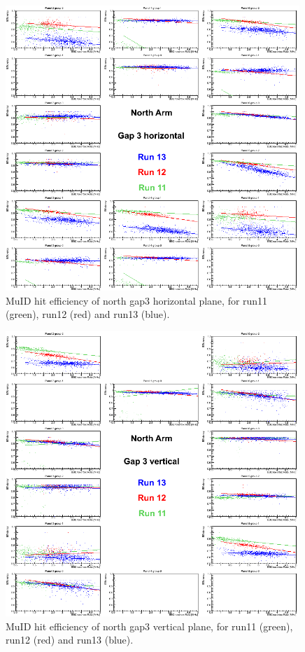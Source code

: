 \clearpage
\begin{center}
  \begin{figure}[p]
    \includegraphics[width=0.99\textwidth]{./figures/efficomp_North_gap3_horizontal.png}
    \caption{\label{Fig:efficiency:MuIdEff:a1g3p0}MuID hit efficiency of north gap3 horizontal plane, for run11 (green), run12 (red) and run13 (blue).}
  \end{figure}
\end{center}
\begin{center}
  \begin{figure}[p]
    \includegraphics[width=0.99\textwidth]{./figures/efficomp_North_gap3_vertical.png}
    \caption{\label{Fig:efficiency:MuIdEff:a1g3p1}MuID hit efficiency of north gap3 vertical plane, for run11 (green), run12 (red) and run13 (blue).}
  \end{figure}
\end{center}
